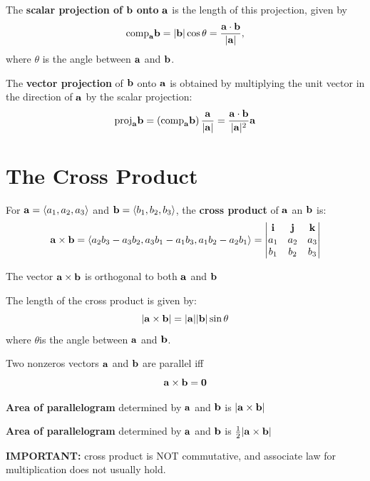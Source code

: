 \documentclass{report}
\begin{document}
The \textbf{scalar projection of} $\mathbf{b}$ \textbf{onto} $\mathbf{a}$ is the length of this 
projection, given by
\[
\text{comp}_{\mathbf{a}} \mathbf{b} = |\mathbf{b}|\cos\theta = \frac{\mathbf{a} \cdot \mathbf{b}}{|\mathbf{a}|},
\]
where $\theta$ is the angle between $\mathbf{a}$ and $\mathbf{b}$.

The \textbf{vector projection} of $\mathbf{b}$ onto $\mathbf{a}$ is obtained by multiplying the 
unit vector in the direction of $\mathbf{a}$ by the scalar projection:
\[
\text{proj}_{\mathbf{a}} \mathbf{b} = \left(\text{comp}_{\mathbf{a}} \mathbf{b} \right)\frac{\mathbf{a}}{|\mathbf{a}|} 
= \frac{\mathbf{a} \cdot \mathbf{b}}{|\mathbf{a}|^2}\mathbf{a}
\]

\section{The Cross Product}

\begin{definition}
For $\mathbf{a} = \langle a_1, a_2, a_3 \rangle$ and $\mathbf{b} = \langle b_1, b_2, b_3 \rangle$, the \textbf{cross product}
of $\mathbf{a}$ an $\mathbf{b}$ is:
\[\mathbf{a} \times \mathbf{b} = \langle a_2 b_3 - a_3 b_2, a_3 b_1 - a_1 b_3, a_1 b_2 - a_2 b_1 \rangle = \begin{vmatrix}
\mathbf{i} & \mathbf{j} & \mathbf{k} \\
a_1 & a_2 & a_3 \\
b_1 & b_2 & b_3
\end{vmatrix}
\]
\end{definition}

\begin{theorem}
    The vector $\mathbf{a} \times \mathbf{b}$ is orthogonal to both $\mathbf{a}$ and $\mathbf{b}$
\end{theorem}

\begin{theorem}
    The length of the cross product is given by: 
    \[ |\mathbf{a} \times \mathbf{b}| = |\mathbf{a}| |\mathbf{b}| \sin \theta\]
    where $\theta$is the angle between $\mathbf{a}$ and $\mathbf{b}$.
\end{theorem}

\begin{corollary}
    Two nonzeros vectors $\mathbf{a}$ and $\mathbf{b}$ are parallel iff 
    \[\mathbf{a} \times \mathbf{b} = \mathbf{0}\]
\end{corollary}

\textbf{Area of parallelogram} determined by $\mathbf{a}$ and $\mathbf{b}$ is $|\mathbf{a} \times \mathbf{b}|$

\textbf{Area of parallelogram} determined by $\mathbf{a}$ and $\mathbf{b}$ is $\frac{1}{2}|\mathbf{a} \times \mathbf{b}|$

\textbf{IMPORTANT:} cross product is NOT commutative, and associate law for multiplication does not usually hold.
\end{document}
